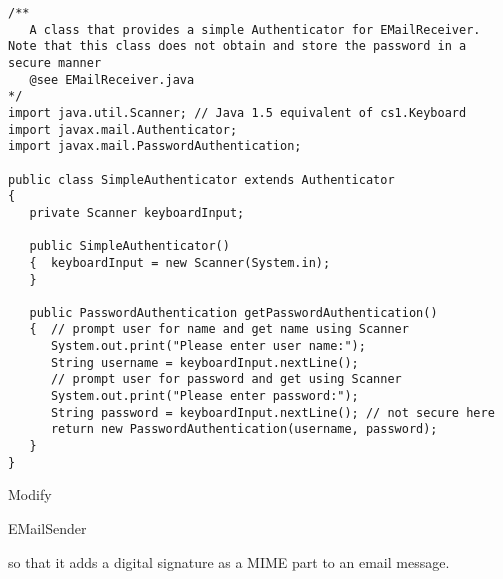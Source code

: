 \begin{lstlisting}[caption=email authenticator]
/**
   A class that provides a simple Authenticator for EMailReceiver. Note that this class does not obtain and store the password in a secure manner
   @see EMailReceiver.java
*/
import java.util.Scanner; // Java 1.5 equivalent of cs1.Keyboard
import javax.mail.Authenticator;
import javax.mail.PasswordAuthentication;

public class SimpleAuthenticator extends Authenticator
{
   private Scanner keyboardInput;

   public SimpleAuthenticator()
   {  keyboardInput = new Scanner(System.in);
   }

   public PasswordAuthentication getPasswordAuthentication()
   {  // prompt user for name and get name using Scanner
      System.out.print("Please enter user name:");
      String username = keyboardInput.nextLine();
      // prompt user for password and get using Scanner
      System.out.print("Please enter password:");
      String password = keyboardInput.nextLine(); // not secure here
      return new PasswordAuthentication(username, password);
   }
}
\end{lstlisting}

\begin{exercise}
Modify \begin{code}EMailSender\end{code} so that it adds
a digital signature as a MIME part to an email message.
\end{exercise}


